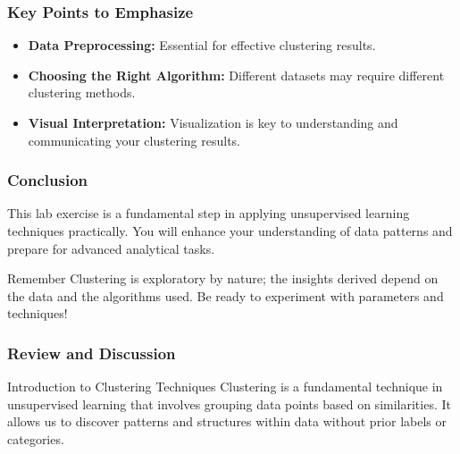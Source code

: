 \documentclass[aspectratio=169]{beamer}
\begin{document}
\begin{frame}
  \frametitle{Key Points to Emphasize}
  \begin{itemize}
    \item \textbf{Data Preprocessing:} Essential for effective clustering results.
    \item \textbf{Choosing the Right Algorithm:} Different datasets may require different clustering methods.
    \item \textbf{Visual Interpretation:} Visualization is key to understanding and communicating your clustering results.
  \end{itemize}
\end{frame}

\begin{frame}
  \frametitle{Conclusion}
  This lab exercise is a fundamental step in applying unsupervised learning techniques practically. You will enhance your understanding of data patterns and prepare for advanced analytical tasks.
  \begin{block}{Remember}
    Clustering is exploratory by nature; the insights derived depend on the data and the algorithms used. Be ready to experiment with parameters and techniques!
  \end{block}
\end{frame}

\begin{frame}
  \frametitle{Review and Discussion}
  \begin{block}{Introduction to Clustering Techniques}
    Clustering is a fundamental technique in unsupervised learning that involves grouping data points based on similarities. 
    It allows us to discover patterns and structures within data without prior labels or categories.
  \end{block}
\end{frame}
\end{document}
